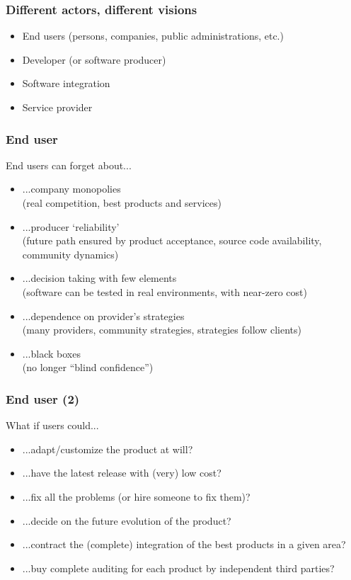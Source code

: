 \documentclass{beamer}
\begin{document}

\begin{frame}
\frametitle{Different actors, different visions}

\begin{itemize}
\item End users (persons, companies, public administrations, etc.)
\item Developer (or software producer)
\item Software integration
\item Service provider
\end{itemize}

\end{frame}


\begin{frame}
\frametitle{End user}

End users can forget about...

\begin{itemize}
\item ...company monopolies \\
  (real competition, best products and services)
\item ...producer `reliability' \\
  (future path ensured by product acceptance, source code availability, community dynamics)
\item ...decision taking with few elements \\
  (software can be tested in real environments, with near-zero cost)
\item ...dependence on provider's strategies \\
  (many providers, community strategies, strategies follow clients)
\item ...black boxes \\
  (no longer ``blind confidence'')
\end{itemize}
\end{frame}


\begin{frame}
\frametitle{End user (2)}

What if users could...

\begin{itemize}
\item ...adapt/customize the product at will?
\item ...have the latest release with (very) low cost?
\item ...fix all the problems (or hire someone to fix them)?
\item ...decide on the future evolution of the product?
\item ...contract the (complete) integration of the best products in a given area?
\item ...buy complete auditing for each product by independent third parties?
\end{itemize}
\end{frame}
\end{document}
